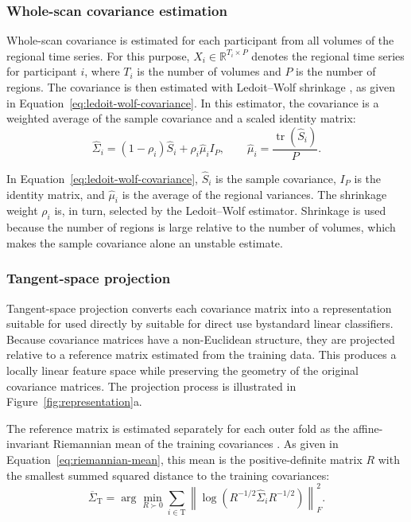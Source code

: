 \subsubsection{Whole-scan covariance estimation}
\label{subsubsec:covariance-estimation}

Whole-scan covariance is estimated for each participant from all volumes of the regional
time series. For this purpose, $X_i \in \mathbb{R}^{T_i \times P}$ denotes the regional
time series for participant $i$, where $T_i$ is the number of volumes and $P$ is the
number of regions. The covariance is then estimated with Ledoit--Wolf shrinkage
\citep{LedoitWolf2004}, as given in Equation~\eqref{eq:ledoit-wolf-covariance}. In this estimator, the
covariance is a weighted average of the sample covariance and a scaled identity matrix:
\begin{equation}
\widehat{\Sigma}_i
=
(1-\rho_i)\widehat{S}_i
+
\rho_i \widehat{\mu}_i I_P,
\qquad
\widehat{\mu}_i
=
\frac{\operatorname{tr}(\widehat{S}_i)}{P}.
\label{eq:ledoit-wolf-covariance}
\end{equation}

In Equation~\eqref{eq:ledoit-wolf-covariance}, $\widehat{S}_i$ is the sample covariance, $I_P$ is the identity
matrix, and $\widehat{\mu}_i$ is the average of the regional variances. The shrinkage
weight $\rho_i$ is, in turn, selected by the Ledoit--Wolf estimator. Shrinkage is used
because the number of regions is large relative to the number of volumes, which makes the
sample covariance alone an unstable estimate.

\subsubsection{Tangent-space projection}
\label{subsubsec:tangent-projection}

Tangent-space projection converts each covariance matrix into a representation suitable for 
used directly by suitable for direct use bystandard linear classifiers. Because covariance matrices have a
non-Euclidean structure, they are projected relative to a reference matrix estimated from
the training data. This produces a locally linear feature space while preserving the
geometry of the original covariance matrices. The projection process is illustrated in
Figure~\ref{fig:representation}a.

The reference matrix is estimated separately for each outer fold as the affine-invariant
Riemannian mean of the training covariances \citep{Varoquauxetal2010,Dadietal2019}. As
given in Equation~\eqref{eq:riemannian-mean}, this mean is the positive-definite matrix $R$ with the
smallest summed squared distance to the training covariances:
\begin{equation}
\overline{\Sigma}_{\mathrm{T}}
=
\arg\min_{R \succ 0}
\sum_{i \in \mathrm{T}}
\left\|
\log\!\left(R^{-1/2}\widehat{\Sigma}_iR^{-1/2}\right)
\right\|_F^2.
\label{eq:riemannian-mean}
\end{equation}

